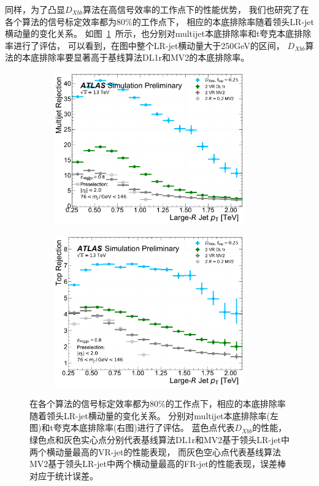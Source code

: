 同样，为了凸显$D_{Xbb}$算法在高信号效率的工作点下的性能优势，
我们也研究了在各个算法的信号标定效率都为$80\%$的工作点下，
相应的本底排除率随着领头LR-jet横动量的变化关系。
如图~\ref{fig:PT80}~所示，也分别对multijet本底排除率和t夸克本底排除率进行了评估，
可以看到，在图中整个LR-jet横动量大于250GeV的区间，
$D_{Xbb}$算法的本底排除率要显著高于基线算法DL1r和MV2的本底排除率。

\begin{figure}[!thbp]
  \begin{subfigure}{.5\textwidth}
  \centering
  \includegraphics[width=0.9\textwidth]{figuresXbb/pulled/eff_vs_pt/const_eff_80/dijet.pdf}
  \caption{}
  \end{subfigure}
  \begin{subfigure}{.5\textwidth}
  \centering
  \includegraphics[width=0.9\textwidth]{figuresXbb/pulled/eff_vs_pt/const_eff_80/top.pdf}
  \caption{}
  \end{subfigure}
  \caption{ 在各个算法的信号标定效率都为$80\%$的工作点下，相应的本底排除率随着领头LR-jet横动量的变化关系。
  分别对multijet本底排除率(左图)和t夸克本底排除率(右图)进行了评估。
  蓝色点代表$D_{Xbb}$的性能，绿色点和灰色实心点分别代表基线算法DL1r和MV2基于领头LR-jet中两个横动量最高的VR-jet的性能表现，
而灰色空心点代表基线算法MV2基于领头LR-jet中两个横动量最高的FR-jet的性能表现，误差棒对应于统计误差。}
\label{fig:PT80}
\end{figure}

